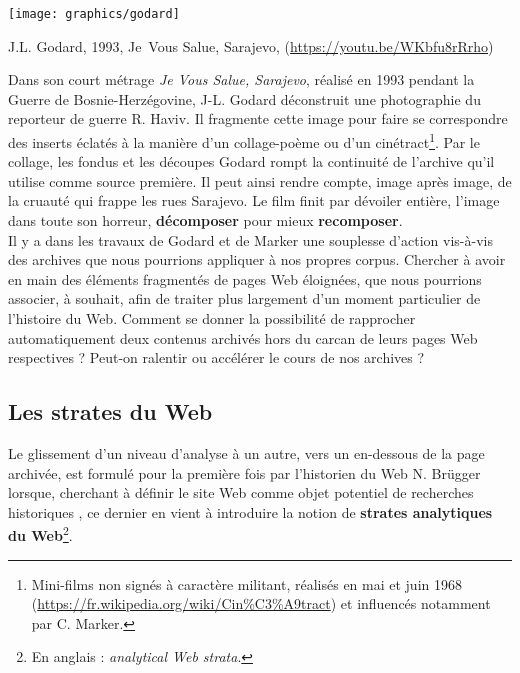 \documentclass[symmetric,justified,marginals=raggedouter]{tufte-book}
\begin{document}
\begin{marginfigure}%
  \texttt{[image: graphics/godard]}
  \caption{J.L. Godard, 1993, Je~Vous Salue, Sarajevo, (\url{https://youtu.be/WKbfu8rRrho})}
  \label{fig:godard}
\end{marginfigure}

Dans son court métrage \textit{Je Vous Salue, Sarajevo}, réalisé en 1993 pendant la Guerre de Bosnie-Herzégovine, J-L. Godard déconstruit une photographie du reporteur de guerre R. Haviv. Il fragmente cette image pour faire se correspondre des inserts éclatés à la manière d'un collage-poème ou d'un cinétract\footnote{\RaggedOuter Mini-films non signés à caractère militant, réalisés en mai et juin 1968 (\url{https://fr.wikipedia.org/wiki/Cin\%C3\%A9tract}) et influencés notamment par C. Marker.}. Par le collage, les fondus et les découpes Godard rompt la continuité de l'archive qu'il utilise comme source première. Il peut ainsi rendre compte, image après image, de la cruauté qui frappe les rues Sarajevo. Le film finit par dévoiler entière, l'image dans toute son horreur, \textbf{décomposer} pour mieux \textbf{recomposer}.\\

\noindent Il y a dans les travaux de Godard et de Marker une souplesse d'action vis-à-vis des archives que nous pourrions appliquer à nos propres corpus. Chercher à avoir en main des éléments fragmentés de pages Web éloignées, que nous pourrions associer, à souhait, afin de traiter plus largement d'un moment particulier de l'histoire du Web. Comment se donner la possibilité de rapprocher automatiquement deux contenus archivés hors du carcan de leurs pages Web respectives ? Peut-on ralentir ou accélérer le cours de nos archives ? 

\subsection{Les strates du Web}

\noindent Le glissement d'un niveau d'analyse à un autre, vers un en-dessous de la page archivée, est formulé pour la première fois par l'historien du Web N. Brügger lorsque, cherchant à définir le site Web comme objet potentiel de recherches historiques \citep{brugger_website_2009}, ce dernier en vient à introduire la notion de \textbf{strates analytiques du Web}\footnote{\RaggedOuter En anglais : \textit{analytical Web strata}.}.
\end{document}
